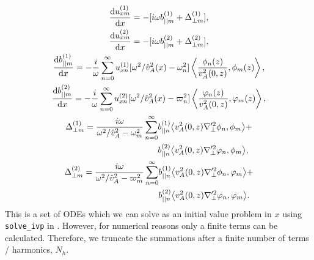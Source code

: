 \begin{gather}
    \label{eq:oblique_field_ux1_numerical}
    \dv{u_{xm}^{(1)}}{x} = -[i\omega b_{||m}^{(1)} + \Delta_{\perp m}^{(1)}], \\
    \dv{u_{xm}^{(2)}}{x} = -[i\omega b_{||m}^{(2)} + \Delta_{\perp m}^{(2)}], \\
    \dv{b_{||m}^{(1)}}{x} = -\frac{i}{\omega}\sum_{n=0}^\infty u_{xn}^{(1)}[\omega^2/\hat{v}_A^2(x)-\omega_n^2]\left\langle\frac{\phi_n(z)}{v_A^2(0,z)},\phi_m(z)\right\rangle, \\
    \dv{b_{||m}^{(2)}}{x} = -\frac{i}{\omega}\sum_{n=0}^\infty u_{xn}^{(2)}[\omega^2/\hat{v}_A^2(x)-\varpi_n^2]\left\langle\frac{\varphi_n(z)}{v_A^2(0,z)},\varphi_m(z)\right\rangle, \\
    \begin{aligned}
    \Delta_{\perp m}^{(1)} = \frac{i\omega}{\omega^2/\hat{v}_A^2-\omega_m^2}\sum_{n=0}^\infty &b_{||n}^{(1)}\big\langle v_A^2(0,z) \nabla_\perp'^2\phi_n,\phi_m\big\rangle + \\
    &b_{||n}^{(2)}\big\langle v_A^2(0,z) \nabla_\perp'^2\varphi_n,\phi_m\big\rangle,
    \end{aligned} \\
    \label{eq:oblique_field_Delta_perp2_numerical}
    \begin{aligned}
    \Delta_{\perp m}^{(2)} = \frac{i\omega}{\omega^2/\hat{v}_A^2-\varpi_m^2}\sum_{n=0}^\infty & b_{||n}^{(1)}\big\langle v_A^2(0,z) \nabla_\perp'^2\phi_n,\varphi_m\big\rangle+\\
    &b_{||n}^{(2)}\big\langle v_A^2(0,z) \nabla_\perp'^2\varphi_n,\varphi_m\big\rangle.
    \end{aligned}
\end{gather}
This is a set of ODEs which we can solve as an initial value problem in $x$ using \texttt{solve\_ivp} in \citet{SciPy2020}. However, for numerical reasons only a finite terms can be calculated. Therefore, we truncate the summations after a finite number of terms / harmonics, $N_h$.

